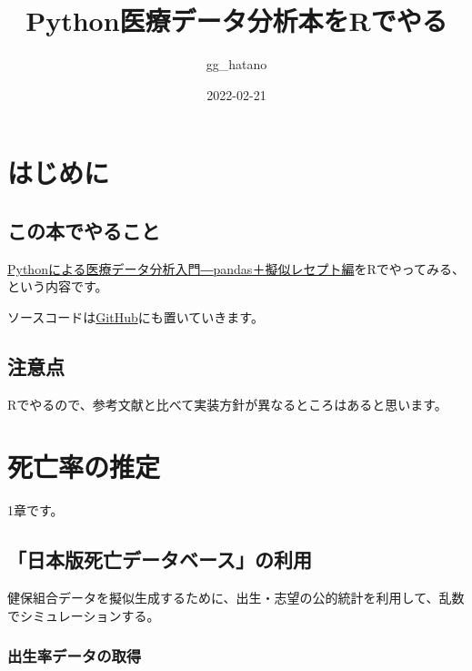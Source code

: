 \documentclass[
]{book}
\title{Python医療データ分析本をRでやる}
\author{gg\_hatano}
\date{2022-02-21}
\begin{document}
\maketitle

{
\setcounter{tocdepth}{1}
\tableofcontents
}
\hypertarget{ux306fux3058ux3081ux306b}{%
\chapter{はじめに}\label{ux306fux3058ux3081ux306b}}

\hypertarget{ux3053ux306eux672cux3067ux3084ux308bux3053ux3068}{%
\section{この本でやること}\label{ux3053ux306eux672cux3067ux3084ux308bux3053ux3068}}

\href{https://gihyo.jp/book/2020/978-4-297-11517-3}{Pythonによる医療データ分析入門―pandas＋擬似レセプト編}をRでやってみる、という内容です。

ソースコードは\href{https://github.com/gghatano/python_synthetic_medical_data}{GitHub}にも置いていきます。

\hypertarget{ux6ce8ux610fux70b9}{%
\section{注意点}\label{ux6ce8ux610fux70b9}}

Rでやるので、参考文献と比べて実装方針が異なるところはあると思います。

\hypertarget{ux6b7bux4ea1ux7387ux306eux63a8ux5b9a}{%
\chapter{死亡率の推定}\label{ux6b7bux4ea1ux7387ux306eux63a8ux5b9a}}

1章です。

\hypertarget{ux65e5ux672cux7248ux6b7bux4ea1ux30c7ux30fcux30bfux30d9ux30fcux30b9ux306eux5229ux7528}{%
\section{「日本版死亡データベース」の利用}\label{ux65e5ux672cux7248ux6b7bux4ea1ux30c7ux30fcux30bfux30d9ux30fcux30b9ux306eux5229ux7528}}

健保組合データを擬似生成するために、出生・志望の公的統計を利用して、乱数でシミュレーションする。

\hypertarget{ux51faux751fux7387ux30c7ux30fcux30bfux306eux53d6ux5f97}{%
\subsection{出生率データの取得}\label{ux51faux751fux7387ux30c7ux30fcux30bfux306eux53d6ux5f97}}
\end{document}

